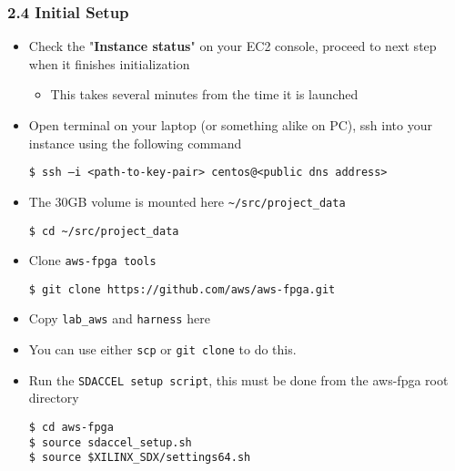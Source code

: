 \documentclass[]{article}
\begin{document}
\hypertarget{header-n278}{%
\subsubsection{2.4 Initial Setup}\label{header-n278}}

\begin{itemize}
\item
  Check the "\textbf{Instance status}" on your EC2 console, proceed to
  next step when it finishes initialization

  \begin{itemize}
  \item
    This takes several minutes from the time it is launched 
  \end{itemize}
\item
  Open terminal on your laptop (or something alike on PC), ssh into your
  instance using the following command

\begin{verbatim}
$ ssh –i <path-to-key-pair> centos@<public dns address>
\end{verbatim}
\end{itemize}

\begin{itemize}
\item
  The 30GB volume is mounted here
  \texttt{\textasciitilde{}/src/project\_data}

\begin{verbatim}
$ cd ~/src/project_data
\end{verbatim}
\end{itemize}

\begin{itemize}
\item
  Clone \texttt{aws-fpga\ tools}

\begin{verbatim}
$ git clone https://github.com/aws/aws-fpga.git
\end{verbatim}
\end{itemize}

\begin{itemize}
\item
  Copy \texttt{lab\_aws} and \texttt{harness} here
\end{itemize}

\begin{itemize}
\item
  You can use either \texttt{scp} or \texttt{git\ clone} to do this.
\item
  Run the \texttt{SDACCEL\ setup\ script}, this must be done from the
  aws-fpga root directory

\begin{verbatim}
$ cd aws-fpga
$ source sdaccel_setup.sh
$ source $XILINX_SDX/settings64.sh
\end{verbatim}
\end{itemize}
\end{document}
